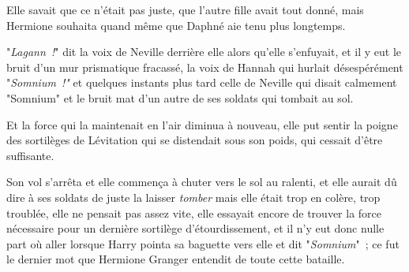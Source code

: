 \later

Elle savait que ce n'était pas juste, que l'autre fille avait tout donné, mais Hermione souhaita quand même que Daphné aie tenu plus longtemps.

"\emph{Lagann~!}" dit la voix de Neville derrière elle alors qu'elle s'enfuyait, et il y eut le bruit d'un mur prismatique fracassé, la voix de Hannah qui hurlait désespérément "\emph{Somnium~!"} et quelques instants plus tard celle de Neville qui disait calmement "Somnium" et le bruit mat d'un autre de ses soldats qui tombait au sol.

Et la force qui la maintenait en l'air diminua à nouveau, elle put sentir la poigne des sortilèges de Lévitation qui se distendait sous son poids, qui cessait d'être suffisante.

Son vol s'arrêta et elle commença à chuter vers le sol au ralenti, et elle aurait dû dire à ses soldats de juste la laisser \emph{tomber} mais elle était trop en colère, trop troublée, elle ne pensait pas assez vite, elle essayait encore de trouver la force nécessaire pour un dernière sortilège d'étourdissement, et il n'y eut donc nulle part où aller lorsque Harry pointa sa baguette vers elle et dit "\emph{Somnium}"~; ce fut le dernier mot que Hermione Granger entendit de toute cette bataille. 

